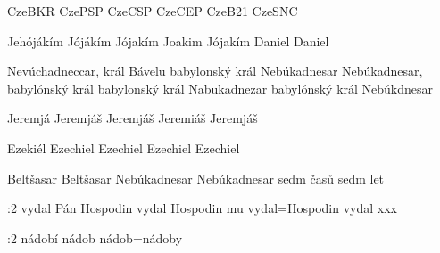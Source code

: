
 {CzeBKR} {CzePSP} {CzeCSP} {CzeCEP} {CzeB21} {CzeSNC}

 {Jehójákím} {Jójákím} {Jójakím} {Joakim} {Jójakím}
 {} {Daniel} {Daniel} {} {}

       {Nevúchadneccar, král Bávelu}
       {babylonský král Nebúkadnesar}
       {Nebúkadnesar, babylónský král}
       {babylonský král Nabukadnezar}                  
       {babylónský král Nebúkdnesar}                        

        {Jeremjá} %
        {Jeremjáš} %
        {Jeremjáš} %
        {Jeremiáš} %
        {Jeremjáš} %

       {Ezekiél} %
       {Ezechiel} %
       {Ezechiel} %
       {Ezechiel} %
       {Ezechiel} %

       {}  {Beltšasar}    {Beltšasar}    {} {}
 {}  {Nebúkadnesar} {Nebúkadnesar} {} {}
       {}  {sedm časů}    {sedm let}     {} {}


:2 {vydal Pán} {} {Hospodin vydal} {Hospodin mu vydal}={Hospodin vydal xxx} {} {}

:2 {nádobí} {} {nádob} {nádob}={nádoby} {} {}
